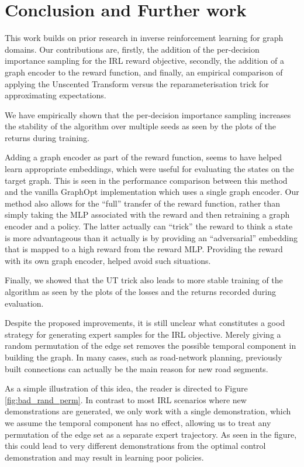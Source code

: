 \documentclass{report}
\numberwithin{equation}{section}
\numberwithin{figure}{section}
\numberwithin{table}{section}
\numberwithin{algorithm}{section}
\begin{document}
\chapter{Conclusion and Further work}\label{chap:conclusion}
This work builds on prior research in inverse reinforcement learning 
for graph domains. Our contributions are, firstly, the addition of the 
per-decision importance sampling for the IRL reward objective, 
secondly, the addition of a graph encoder to the reward function, 
and finally, an empirical comparison of applying the Unscented 
Transform \citep{JulierUT} versus the reparameterisation trick 
for approximating expectations.

We have empirically shown that the per-decision importance 
sampling increases
the stability of the algorithm over multiple seeds as seen by 
the plots of the returns during training.

Adding a graph encoder as part of the reward function, seems to 
have helped learn appropriate embeddings, which were useful for 
evaluating the states on the target graph. This is seen in the 
performance comparison between this method and 
the vanilla GraphOpt \citep{GraphOpt} 
implementation which uses a single graph encoder. Our method 
also allows for the ``full'' transfer of the reward function, 
rather than simply taking the MLP associated with the reward and 
then retraining a graph encoder and a policy. The latter actually 
can ``trick'' the reward to think a state is more advantageous than 
it actually is by providing an ``adversarial'' embedding that is 
mapped to a high reward from the reward MLP. Providing the reward 
with its own graph encoder, helped avoid such situations.

Finally, we showed that the UT trick also leads to more stable 
training of the algorithm as seen by the plots of the losses 
and the returns recorded during evaluation.

Despite the proposed improvements, it is still unclear what constitutes 
a good strategy for generating expert samples for the IRL objective. 
Merely giving a random permutation of the edge set removes the possible 
temporal component in building the graph. In many cases, such as 
road-network planning, previously built connections can actually 
be the main reason for new road segments. 

As a simple illustration 
of this idea, the reader is directed to Figure \ref{fig:bad_rand_perm}.
In contrast to most IRL scenarios where new demonstrations are generated, 
we only work with a single demonstration, which we assume the temporal 
component has no effect, allowing us to treat any permutation of the 
edge set as a separate expert trajectory. As seen in the figure, this 
could lead to very different demonstrations from the optimal control 
demonstration and may result in learning poor policies.
\end{document}
